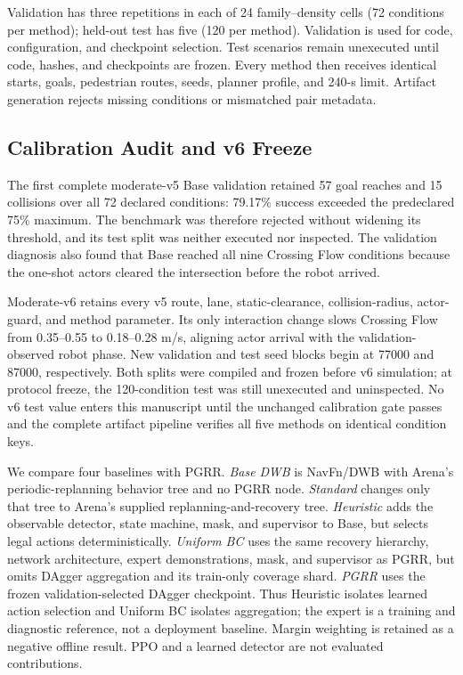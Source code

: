 Validation has three repetitions in each of 24 family--density cells (72
conditions per method); held-out test has five (120 per method).  Validation is
used for code, configuration, and checkpoint selection.  Test scenarios remain
unexecuted until code, hashes, and checkpoints are frozen.  Every method then
receives identical starts, goals, pedestrian routes, seeds, planner profile,
and 240-s limit.  Artifact generation rejects missing conditions or mismatched
pair metadata.

\subsection{Calibration Audit and v6 Freeze}
The first complete moderate-v5 Base validation retained 57 goal reaches and 15
collisions over all 72 declared conditions: 79.17\% success exceeded the
predeclared 75\% maximum.  The benchmark was therefore rejected without
widening its threshold, and its test split was neither executed nor inspected.
The validation diagnosis also found that Base reached all nine Crossing Flow
conditions because the one-shot actors cleared the intersection before the
robot arrived.

Moderate-v6 retains every v5 route, lane, static-clearance, collision-radius,
actor-guard, and method parameter.  Its only interaction change slows Crossing
Flow from 0.35--0.55 to 0.18--0.28 m/s, aligning actor arrival with the
validation-observed robot phase.  New validation and test seed blocks begin at
77000 and 87000, respectively.  Both splits were compiled and frozen before
v6 simulation; at protocol freeze, the 120-condition test was still
unexecuted and uninspected.  No v6 test value enters this manuscript until the
unchanged calibration gate passes and the complete artifact pipeline verifies
all five methods on identical condition keys.

We compare four baselines with PGRR.  \emph{Base DWB} is NavFn/DWB with Arena's
periodic-replanning behavior tree and no PGRR node.  \emph{Standard} changes
only that tree to Arena's supplied replanning-and-recovery tree.
\emph{Heuristic} adds the observable detector, state machine, mask, and
supervisor to Base, but selects legal actions deterministically.
\emph{Uniform BC} uses the same recovery hierarchy, network architecture,
expert demonstrations, mask, and supervisor as PGRR, but omits DAgger
aggregation and its train-only coverage shard.  \emph{PGRR} uses the frozen
validation-selected DAgger checkpoint.  Thus Heuristic isolates learned action
selection and Uniform BC isolates aggregation; the expert is a training and
diagnostic reference, not a deployment baseline.  Margin weighting is retained
as a negative offline result.  PPO and a learned detector are not evaluated
contributions.

